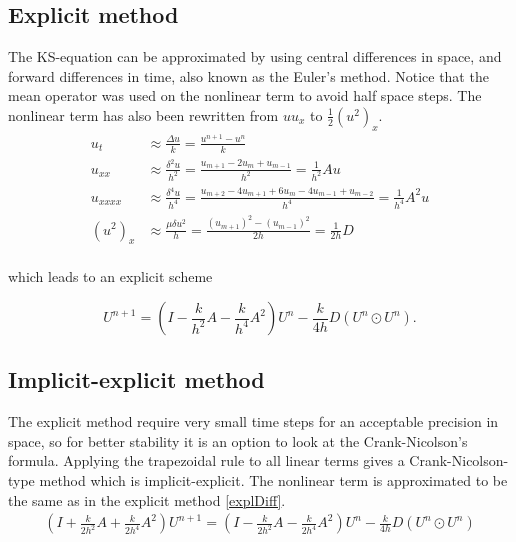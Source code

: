 \subsection{Explicit method}
The KS-equation can be approximated by using central differences in space, and forward differences in time, also known as the Euler's method. Notice that the mean operator was used on the nonlinear term to avoid half space steps.    The nonlinear term has also been rewritten from $uu_x$ to $\frac{1}{2}(u^2)_x$.
\begin{equation*}
\begin{aligned}
u_t &\approx \frac{\Delta u}{k} = \frac{u^{n+1}-u^n}{k} \\
u_{xx} &\approx \frac{\delta^2 u}{h^2} = \frac{u_{m+1}-2u_{m}+u_{m-1}}{h^2} = \frac{1}{h^2}Au \\
u_{xxxx} &\approx \frac{\delta^4 u}{h^4} = \frac{u_{m+2}-4u_{m+1}+6u_m-4u_{m-1}+u_{m-2}}{h^4} = \frac{1}{h^4}A^2u\\
(u^2)_{x} &\approx \frac{\mu \delta u^2}{h} = \frac{(u_{m+1})^2-(u_{m-1})^2}{2h} = \frac{1}{2h}D\\
\end{aligned}
\end{equation*}

which leads to an explicit scheme

\begin{equation}
\label{explDiff}
U^{n+1} = (I - \frac{k}{h^2}A - \frac{k}{h^4}A^2)U^n - \frac{k}{4h}D(U^{n}\odot U^n).
\end{equation}

\subsection{Implicit-explicit method}
The explicit method require very small time steps for an acceptable precision in space, so for better stability it is an option to look at the Crank-Nicolson's formula. Applying the trapezoidal rule to all linear terms gives a Crank-Nicolson-type method which is implicit-explicit. The nonlinear term is approximated to be the same as in the explicit method \eqref{explDiff}.
\begin{align}
\label{implDiff}
(I + \frac{k}{2h^2}A + \frac{k}{2h^4}A^2)U^{n+1}
= (I - \frac{k}{2h^2}A - \frac{k}{2h^4}A^2)U^n - \frac{k}{4h}D(U^{n}\odot U^n)
\end{align}


